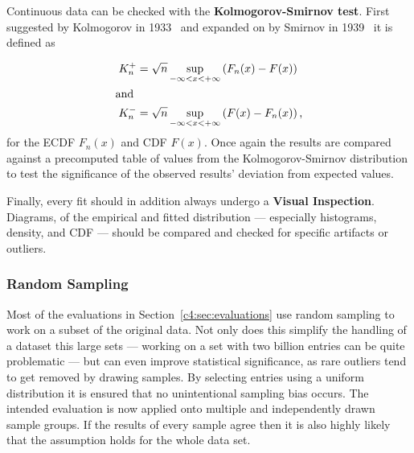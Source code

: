Continuous data can be checked with the \textbf{Kolmogorov-Smirnov test}. First suggested by Kolmogorov in 1933~\cite{kolmogorov1933sulla} and expanded on by Smirnov in 1939~\cite{smirnov1939estimation} it is defined as

\begin{align}
	K_n^+ &= \sqrt{n} \sup_{-\infty < x < + \infty} \left( F_n(x) - F(x) \right) \\
	\shortintertext{and}
	\phantom{,}K_n^- &= \sqrt{n} \sup_{-\infty < x < + \infty} \left( F(x) - F_n(x) \right)\text{,}
\end{align}
%
for the \gls{ECDF} $F_n(x)$ and \gls{CDF} $F(x)$. Once again the results are compared against a precomputed table of values from the Kolmogorov-Smirnov distribution to test the significance of the observed results' deviation from expected values. 

Finally, every fit should in addition always undergo a \textbf{Visual Inspection}. Diagrams, of the empirical and fitted distribution --- especially histograms, density, and \gls{CDF} --- should be compared and checked for specific artifacts or outliers. 



\subsubsection{Random Sampling}

Most of the evaluations in Section~\ref{c4:sec:evaluations} use random sampling to work on a subset of the original data.  Not only does this simplify the handling of a dataset this large sets --- working on a set with two billion entries can be quite problematic --- but can even improve statistical significance, as rare outliers tend to get removed by drawing samples. By selecting entries using a uniform distribution it is ensured that no unintentional sampling bias occurs. The intended evaluation is now applied onto multiple and independently drawn sample groups. If the results of every sample agree then it is also highly likely that the assumption holds for the whole data set.






